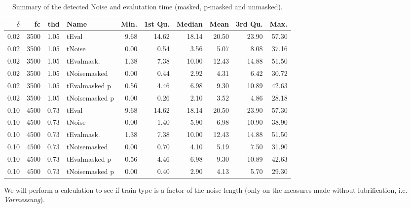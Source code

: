 \documentclass{article}\usepackage[]{graphicx}\usepackage[]{color}
\begin{document}
\begin{table}
\centering
\begin{tabular}{r|r|r|l|r|r|r|r|r|r}
$\delta$ & fc & thd & Name & Min. & 1st Qu. & Median & Mean & 3rd Qu. & Max. \\
  \hline
0.02 & 3500 & 1.05 & tEval & 9.68 & 14.62 & 18.14 & 20.50 & 23.90 & 57.30 \\ 
  0.02 & 3500 & 1.05 & tNoise & 0.00 & 0.54 & 3.56 & 5.07 & 8.08 & 37.16 \\ 
  0.02 & 3500 & 1.05 & tEvalmask. & 1.38 & 7.38 & 10.00 & 12.43 & 14.88 & 51.50 \\ 
  0.02 & 3500 & 1.05 & tNoisemasked & 0.00 & 0.44 & 2.92 & 4.31 & 6.42 & 30.72 \\ 
  0.02 & 3500 & 1.05 & tEvalmasked p & 0.56 & 4.46 & 6.98 & 9.30 & 10.89 & 42.63 \\ 
  0.02 & 3500 & 1.05 & tNoisemasked p & 0.00 & 0.26 & 2.10 & 3.52 & 4.86 & 28.18 \\ 
  0.10 & 4500 & 0.73 & tEval & 9.68 & 14.62 & 18.14 & 20.50 & 23.90 & 57.30 \\ 
  0.10 & 4500 & 0.73 & tNoise & 0.00 & 1.40 & 5.90 & 6.98 & 10.90 & 38.90 \\ 
  0.10 & 4500 & 0.73 & tEvalmask. & 1.38 & 7.38 & 10.00 & 12.43 & 14.88 & 51.50 \\ 
  0.10 & 4500 & 0.73 & tNoisemasked & 0.00 & 0.70 & 4.10 & 5.19 & 7.50 & 31.90 \\ 
  0.10 & 4500 & 0.73 & tEvalmasked p & 0.56 & 4.46 & 6.98 & 9.30 & 10.89 & 42.63 \\ 
  0.10 & 4500 & 0.73 & tNoisemasked p & 0.00 & 0.40 & 2.90 & 4.13 & 5.70 & 29.30 \\ 
   \hline

\end{tabular}
\caption{Summary of the detected Noise and evalutation time (masked, p-masked and unmasked).}
\label{tab:tNoiseSummary}
\end{table}

We will perform a calculation to see if train type is a factor of the noise length (only on the measures made without lubrification, i.e. {\it Vormessung}).
\end{document}
